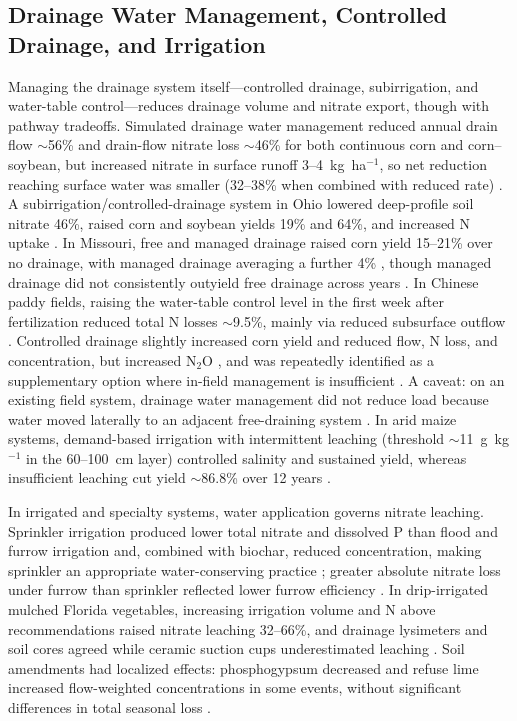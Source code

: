 \documentclass[11pt]{article}
\begin{document}
\subsection{Drainage Water Management, Controlled Drainage, and Irrigation}

Managing the drainage system itself---controlled drainage, subirrigation, and water-table control---reduces drainage volume and nitrate export, though with pathway tradeoffs. Simulated drainage water management reduced annual drain flow $\sim$56\% and drain-flow nitrate loss $\sim$46\% for both continuous corn and corn--soybean, but increased nitrate in surface runoff 3--4~kg~ha$^{-1}$, so net reduction reaching surface water was smaller (32--38\% when combined with reduced rate) \parencite{Ale2012b}. A subirrigation/controlled-drainage system in Ohio lowered deep-profile soil nitrate 46\%, raised corn and soybean yields 19\% and 64\%, and increased N uptake \parencite{Fisher1999}. In Missouri, free and managed drainage raised corn yield 15--21\% over no drainage, with managed drainage averaging a further 4\% \parencite{Nash2015}, though managed drainage did not consistently outyield free drainage across years \parencite{Nash2015b}. In Chinese paddy fields, raising the water-table control level in the first week after fertilization reduced total N losses $\sim$9.5\%, mainly via reduced subsurface outflow \parencite{He2019b}. Controlled drainage slightly increased corn yield and reduced flow, N loss, and concentration, but increased N$_2$O \parencite{Wang2016b}, and was repeatedly identified as a supplementary option where in-field management is insufficient \parencite{HernandezRamirez2011}. A caveat: on an existing field system, drainage water management did not reduce load because water moved laterally to an adjacent free-draining system \parencite{David2015}. In arid maize systems, demand-based irrigation with intermittent leaching (threshold $\sim$11~g~kg$^{-1}$ in the 60--100~cm layer) controlled salinity and sustained yield, whereas insufficient leaching cut yield $\sim$86.8\% over 12 years \parencite{Liu2024}.

In irrigated and specialty systems, water application governs nitrate leaching. Sprinkler irrigation produced lower total nitrate and dissolved P than flood and furrow irrigation and, combined with biochar, reduced concentration, making sprinkler an appropriate water-conserving practice \parencite{Farahani2020}; greater absolute nitrate loss under furrow than sprinkler reflected lower furrow efficiency \parencite{Hurtado2011}. In drip-irrigated mulched Florida vegetables, increasing irrigation volume and N above recommendations raised nitrate leaching 32--66\%, and drainage lysimeters and soil cores agreed while ceramic suction cups underestimated leaching \parencite{Zotarelli2007}. Soil amendments had localized effects: phosphogypsum decreased and refuse lime increased flow-weighted concentrations in some events, without significant differences in total seasonal loss \parencite{Hurtado2011}.
\end{document}
